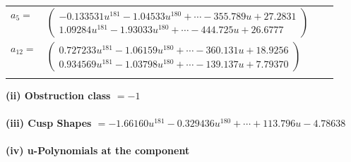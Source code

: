 \documentclass[1p]{elsarticle_modified}
\theoremstyle{definition}
\begin{document}
\begin{tabular}{m{7pt} m{180pt} m{7pt} m{180pt} }
\flushright $a_{5}=$&$\begin{pmatrix}-0.133531 u^{181}-1.04533 u^{180}+\cdots-355.789 u+27.2831\\1.09284 u^{181}-1.93033 u^{180}+\cdots-444.725 u+26.6777\end{pmatrix}$ \\
\flushright $a_{12}=$&$\begin{pmatrix}0.727233 u^{181}-1.06159 u^{180}+\cdots-360.131 u+18.9256\\0.934569 u^{181}-1.03798 u^{180}+\cdots-139.137 u+7.79370\end{pmatrix}$\\&\end{tabular}
\flushleft \textbf{(ii) Obstruction class $= -1$}\\~\\
\flushleft \textbf{(iii) Cusp Shapes $= -1.66160 u^{181}-0.329436 u^{180}+\cdots+113.796 u-4.78638$}\\~\\
\newpage\renewcommand{\arraystretch}{1}
\flushleft \textbf{(iv) u-Polynomials at the component}\newline \\
\end{document}
